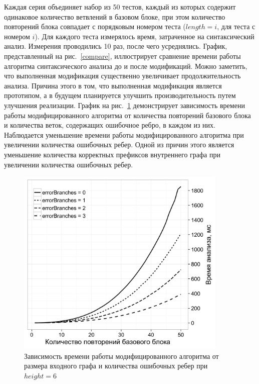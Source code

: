 Каждая серия объединяет набор из 50 тестов, каждый из которых содержит одинаковое количество ветвлений в базовом блоке, при этом количество повторений блока совпадает с порядковым номером теста ($length = i$, для теста с номером $i$). Для каждого теста измерялось время, затраченное на синтаксический анализ. Измерения проводились 10 раз, после чего усреднялись. График, представленный на рис.~\ref{compare}, иллюстрирует сравнение времени работы алгоритма синтаксического анализа до и после модификаций. Можно заметить, что выполненная модификация существенно увеличивает продолжительность анализа. Причина этого в том, что выполненная модификация является прототипом, а в будущем планируется улучшить производительность путем улучшения реализации. График на рис.~\ref{withErrors} демонстрирует зависимость времени работы модифицированного алгоритма от количества повторений базового блока и количества веток, содержащих ошибочное ребро, в каждом из них. Наблюдается уменьшение времени работы модифицированного алгоритма при увеличении количества ошибочных ребер. Одной из причин этого является уменьшение количества корректных префиксов внутреннего графа при увеличении количества ошибочных ребер.

\begin{figure}[H]
 \centering
 \includegraphics[width=0.9\textwidth]{Azimov/pictures/error_branches4_black.png}
 \caption{Зависимость времени работы модифицированного алгоритма от размера входного графа и количества ошибочных ребер при $height=6$}
 \label{withErrors}
\end{figure}